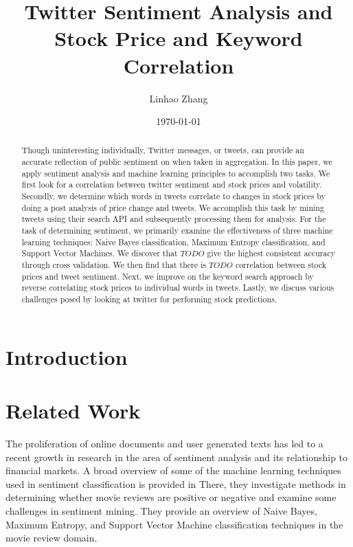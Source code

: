 \documentclass[preprint,pre,floats,aps,amsmath,amssymb,12pt]{revtex4}
\begin{document}
\title{Twitter Sentiment Analysis and Stock Price and Keyword Correlation}
\author{Linhao Zhang}
\date{\today}

\begin{abstract}

Though uninteresting individually, Twitter messages, or tweets, can provide an accurate reflection of public sentiment on when taken in aggregation. In this paper, we apply sentiment analysis and machine learning principles to accomplish two tasks. We first look for a correlation between twitter sentiment and stock prices and volatility. Secondly, we determine which words in tweets correlate to changes in stock prices by doing a post analysis of price change and tweets. We accomplish this task by mining tweets using their search API and subsequently processing them for analysis. For the task of determining sentiment, we primarily examine the effectiveness of three machine learning techniques: Naive Bayes classification, Maximum Entropy classification, and Support Vector Machines. We discover that $TODO$ give the highest consistent accuracy through cross validation. We then find that there is $TODO$ correlation between stock prices and tweet sentiment. Next, we improve on the keyword search approach by reverse correlating stock prices to individual words in tweets. Lastly, we discuss various challenges posed by looking at twitter for performing stock predictions. 

\end{abstract}

\maketitle

\section{Introduction}
\label{sec:intro}




\section{Related Work}
\label{sec:rel}
The proliferation of online documents and user generated texts has led to a recent growth in research in the area of sentiment analysis and its relationship to financial markets. A broad overview of some of the machine learning techniques used in sentiment classification is provided in \cite{Pang} There, they investigate methods in determining whether movie reviews are positive or negative and examine some challenges in sentiment mining. They provide an overview of Naive Bayes, Maximum Entropy, and Support Vector Machine classification techniques in the movie review domain. 
\end{document}
